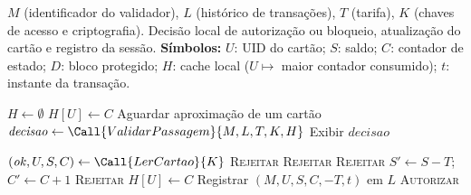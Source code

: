 
\begin{algorithm}[htbp]
  \small
  \algrenewcommand{}
  \algrenewcommand{}
  \algrenewcommand{}
  \algrenewcommand{}
  \algrenewcommand{}
  \algrenewcommand{}
  \algrenewcommand{}
  \algrenewcommand{}
  \algrenewcommand{}
  \algrenewcommand{}
  \algrenewcommand{}
  \algrenewcommand{}

  \caption{Prevenção local no validador durante a operação em campo.}
  \label{alg:prevention}
  \begin{algorithmic}[1]
    \Require $M$ (identificador do validador), $L$ (histórico de transações), $T$ (tarifa), $K$ (chaves de acesso e criptografia).
    \Ensure Decisão local de autorização ou bloqueio, atualização do cartão e registro da sessão.
    \Statex \textbf{Símbolos:} $U$: UID do cartão;\; $S$: saldo;\; $C$: contador de estado;\; $D$: bloco protegido;\; $H$: cache local ($U \mapsto$ maior contador consumido);\; $t$: instante da transação.
    \Statex

      \State $H \gets \emptyset$ 
       
          \State $H[U] \gets C$
        \EndIf
      \EndFor
        \State Aguardar aproximação de um cartão
        \State $\mathit{decisao} \gets \Call{ValidarPassagem}{M, L, T, K, H}$
        \State Exibir $\mathit{decisao}$
      \EndWhile
    \EndProcedure

      \State $(\mathit{ok}, U, S, C) \gets \Call{LerCartao}{K}$
        \Return \textsc{Rejeitar} 
      \EndIf
        \Return \textsc{Rejeitar} 
      \EndIf
        \Return \textsc{Rejeitar} 
      \EndIf
      \State $S' \gets S - T$;\quad $C' \gets C + 1$
        \Return \textsc{Rejeitar} 
      \EndIf
      \State $H[U] \gets C$ 
      \State Registrar $(M, U, S, C, -T, t)$ em $L$
      \Return \textsc{Autorizar}
    \EndFunction


\end{algorithmic}
\end{algorithm}

